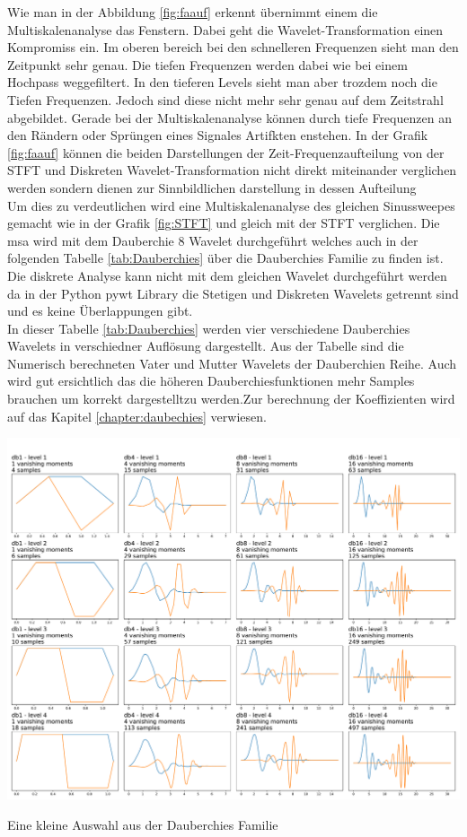 Wie man in der Abbildung \ref{fig:faauf} erkennt übernimmt einem die Multiskalenanalyse das Fenstern. Dabei geht die Wavelet-Transformation einen Kompromiss ein. Im oberen bereich bei den schnelleren Frequenzen sieht man den Zeitpunkt sehr genau. Die tiefen Frequenzen werden dabei wie bei einem Hochpass weggefiltert. In den tieferen Levels sieht man aber trozdem noch die Tiefen Frequenzen. Jedoch sind diese nicht mehr sehr genau auf dem Zeitstrahl abgebildet. Gerade bei der Multiskalenanalyse können durch tiefe Frequenzen an den Rändern oder Sprüngen eines Signales Artifkten enstehen. In der Grafik \ref{fig:faauf} können die beiden Darstellungen der Zeit-Frequenzaufteilung von der STFT und Diskreten Wavelet-Transformation nicht direkt miteinander verglichen werden sondern dienen zur Sinnbildlichen darstellung in dessen Aufteilung\\

Um dies zu verdeutlichen wird eine  Multiskalenanalyse des gleichen Sinussweepes gemacht wie in der Grafik \ref{fig:STFT} und gleich mit der STFT verglichen.
Die msa wird mit dem Dauberchie 8 Wavelet durchgeführt welches auch in der folgenden Tabelle \ref{tab:Dauberchies} über die Dauberchies Familie zu finden ist. Die diskrete Analyse kann nicht mit dem gleichen Wavelet durchgeführt werden da in der Python pywt Library die Stetigen und Diskreten Wavelets getrennt sind und es keine Überlappungen gibt. \\
In dieser Tabelle \ref{tab:Dauberchies} werden vier verschiedene Dauberchies Wavelets in verschiedner Auflösung dargestellt. Aus der Tabelle sind die Numerisch berechneten Vater und Mutter Wavelets der Dauberchien Reihe. Auch wird gut ersichtlich das die höheren Dauberchiesfunktionen mehr Samples brauchen um korrekt dargestelltzu werden.Zur berechnung der Koeffizienten wird auf das Kapitel \ref{chapter:daubechies} verwiesen.\\

\begin{table}
	\includegraphics[width=\linewidth]{papers/autotune/sections/frequenzanalyse/images/DauberchiesFamilie.pdf}
	\caption{Eine kleine Auswahl aus der Dauberchies Familie}
	\label{tab:Dauberchies}
\end{table}

